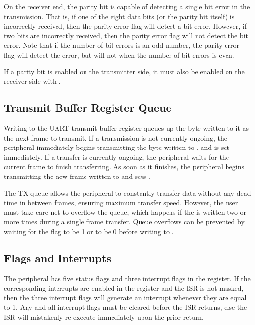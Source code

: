 On the receiver end, the parity bit is capable of detecting a single bit error in the transmission. That is, if one of the eight data bits (or the parity bit itself) is incorrectly received, then the parity error flag  will detect a bit error. However, if two bits are incorrectly received, then the parity error flag will not detect the bit error. Note that if the number of bit errors is an odd number, the parity error flag will detect the error, but will not when the number of bit errors is even.

If a parity bit is enabled on the transmitter side, it must also be enabled on the receiver side with .



\subsection{Transmit Buffer Register Queue}

Writing to the UART transmit buffer register  queues up the byte written to it as the next frame to transmit. If a transmission is not currently ongoing, the  peripheral immediately begins transmitting the byte written to , and  is set immediately. If a transfer is currently ongoing, the  peripheral waits for the current frame to finish transferring. As soon as it finishes, the  peripheral begins transmitting the new frame written to  and sets .

The TX queue allows the  peripheral to constantly transfer data without any dead time in between frames, ensuring maximum transfer speed. However, the user must take care not to overflow the queue, which happens if the  is written two or more times during a single frame transfer. Queue overflows can be prevented by waiting for the  flag to be 1 or  to be 0 before writing to .



\subsection{Flags and Interrupts}

The  peripheral has five status flags and three interrupt flags in the  register. If the corresponding interrupts are enabled in the  register and the  ISR is not masked, then the three interrupt flags will generate an interrupt whenever they are equal to 1. Any and all interrupt flags must be cleared before the  ISR returns, else the ISR will mistakenly re-execute immediately upon the prior return.

